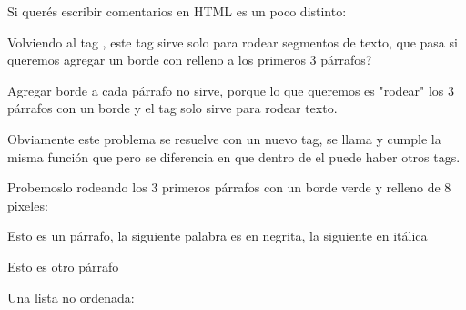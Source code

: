 \documentclass[letterpaper,10pt,spanish]{sphinxmanual}
\begin{document}
Si querés escribir comentarios en HTML es un poco distinto:

%
\begin{sphinxVerbatim}[commandchars=\\\{\}]

\end{sphinxVerbatim}

Volviendo al tag , este tag sirve solo para rodear segmentos de texto,
que pasa si queremos agregar un borde con relleno a los primeros 3 párrafos?

Agregar borde a cada párrafo no sirve, porque lo que queremos es "rodear" los
3 párrafos con un borde y el tag  solo sirve para rodear texto.

Obviamente este problema se resuelve con un nuevo tag, se llama  y cumple
la misma función que  pero se diferencia en que dentro de el puede haber
otros tags.

Probemoslo rodeando los 3 primeros párrafos con un borde verde y relleno de 8
pixeles:

%
\begin{sphinxVerbatim}[commandchars=\\\{\}]
 
  Esto es un párrafo, la siguiente palabra es en
      negrita, la siguiente en
      itálica

   
    Esto es otro párrafo

    Una  lista no ordenada:
\end{sphinxVerbatim}
\end{document}
